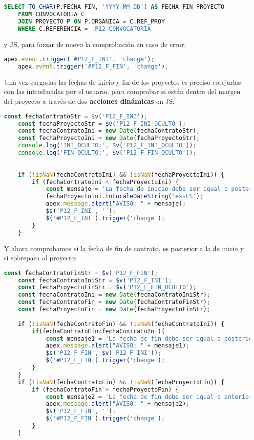 \begin{lstlisting}[language=SQL, caption={Carga fecha fin proyecto}]
	SELECT TO_CHAR(P.FECHA_FIN, 'YYYY-MM-DD') AS FECHA_FIN_PROYECTO
	FROM CONVOCATORIA C 
	JOIN PROYECTO P ON P.ORGANICA = C.REF_PROY
	WHERE C.REFERENCIA = :P12_CONVOCATORIA
\end{lstlisting}

y \acrshort{JS}, para forzar de nuevo la comprobación en caso de error:
\begin{lstlisting}[language=JavaScript, caption={Fuerza nueva petición de fechas si son erróneas}]
	apex.event.trigger('#P12_F_INI', 'change');
	apex.event.trigger('#P12_F_FIN', 'change');
\end{lstlisting}

Una vez cargadas las fechas de inicio y fin de los proyectos es preciso cotejarlas con las introducidas por el usuario, para comprobar si están dentro del margen del proyecto a través de dos \textbf{acciones dinámicas} en \acrshort{JS}:
\begin{lstlisting}[language=JavaScript, caption={Controla que la fecha inicio sea posterior al inicio del proyecto}]
	const fechaContratoStr = $v('P12_F_INI');
	const fechaProyectoStr = $v('P12_F_INI_OCULTO');
	const fechaContratoIni = new Date(fechaContratoStr);
	const fechaProyectoIni = new Date(fechaProyectoStr);
	console.log('INI_OCULTO:', $v('P12_F_INI_OCULTO'));
	console.log('FIN_OCULTO:', $v('P12_F_FIN_OCULTO'));
	
	
	if (!isNaN(fechaContratoIni) && !isNaN(fechaProyectoIni)) {
		if (fechaContratoIni < fechaProyectoIni) {
			const mensaje = 'La fecha de inicio debe ser igual o posterior a: ' +
			fechaProyectoIni.toLocaleDateString('es-ES');
			apex.message.alert("AVISO: " + mensaje);
			$s('P12_F_INI', '');
			$('#P12_F_INI').trigger('change');
		}
	}
\end{lstlisting}

Y ahora comprobamos si la fecha de fin de contrato, es posterior a la de inicio y si sobrepasa al proyecto:
\begin{lstlisting}[language=JavaScript, caption={Controla que la fecha fin sea posterior a inicio y anterior al fin del proyecto}]
	const fechaContratoFinStr = $v('P12_F_FIN');
	const fechaContratoIniStr = $v('P12_F_INI');
	const fechaProyectoFinStr = $v('P12_F_FIN_OCULTO');
	const fechaContratoIni = new Date(fechaContratoIniStr);
	const fechaContratoFin = new Date(fechaContratoFinStr);
	const fechaProyectoFin = new Date(fechaProyectoFinStr);
	
	if (!isNaN(fechaContratoFin) && !isNaN(fechaContratoIni)) {
		if(fechaContratoFin<fechaContratoIni){
			const mensaje1 = 'La fecha de fin debe ser igual o posterior a la de inicio';
			apex.message.alert("AVISO: " + mensaje1);
			$s('P12_F_FIN', $v('P12_F_INI'));
			$('#P12_F_FIN').trigger('change');
		}
	}
	if (!isNaN(fechaContratoFin) && !isNaN(fechaProyectoFin)) {
		if (fechaContratoFin > fechaProyectoFin) {
			const mensaje2 = 'La fecha de fin debe ser igual o anterior a: ' + fechaProyectoFin.toLocaleDateString('es-ES');
			apex.message.alert("AVISO: " + mensaje2);
			$s('P12_F_FIN', '');
			$('#P12_F_FIN').trigger('change');
		}
	}
\end{lstlisting}

